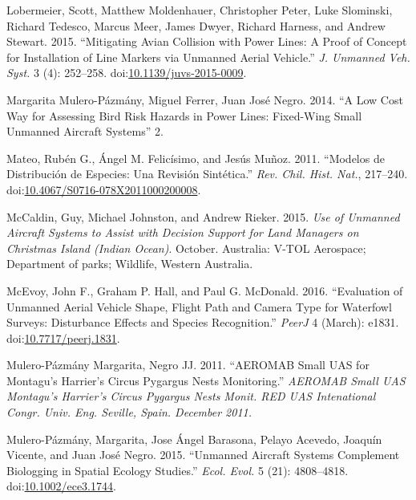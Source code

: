 \documentclass[]{interact}
\theoremstyle{plain}%
\theoremstyle{definition}
\theoremstyle{remark}
\begin{document}
\hypertarget{ref-lobermeier_mitigating_2015}{}
Lobermeier, Scott, Matthew Moldenhauer, Christopher Peter, Luke
Slominski, Richard Tedesco, Marcus Meer, James Dwyer, Richard Harness,
and Andrew Stewart. 2015. ``Mitigating Avian Collision with Power Lines:
A Proof of Concept for Installation of Line Markers via Unmanned Aerial
Vehicle.'' \emph{J. Unmanned Veh. Syst.} 3 (4): 252--258.
doi:\href{https://doi.org/10.1139/juvs-2015-0009}{10.1139/juvs-2015-0009}.

\hypertarget{ref-margarita_mulero-pazmany_juan_jose_negro_low_2014}{}
Margarita Mulero-Pázmány, Miguel Ferrer, Juan José Negro. 2014. ``A Low
Cost Way for Assessing Bird Risk Hazards in Power Lines: Fixed-Wing
Small Unmanned Aircraft Systems'' 2.

\hypertarget{ref-mateo_modelos_2011}{}
Mateo, Rubén G., Ángel M. Felicísimo, and Jesús Muñoz. 2011. ``Modelos
de Distribución de Especies: Una Revisión Sintética.'' \emph{Rev. Chil.
Hist. Nat.}, 217--240.
doi:\href{https://doi.org/10.4067/S0716-078X2011000200008}{10.4067/S0716-078X2011000200008}.

\hypertarget{ref-mccaldin_use_2015}{}
McCaldin, Guy, Michael Johnston, and Andrew Rieker. 2015. \emph{Use of
Unmanned Aircraft Systems to Assist with Decision Support for Land
Managers on Christmas Island (Indian Ocean)}. October. Australia: V-TOL
Aerospace; Department of parks; Wildlife, Western Australia.

\hypertarget{ref-mcevoy_evaluation_2016}{}
McEvoy, John F., Graham P. Hall, and Paul G. McDonald. 2016.
``Evaluation of Unmanned Aerial Vehicle Shape, Flight Path and Camera
Type for Waterfowl Surveys: Disturbance Effects and Species
Recognition.'' \emph{PeerJ} 4 (March): e1831.
doi:\href{https://doi.org/10.7717/peerj.1831}{10.7717/peerj.1831}.

\hypertarget{ref-mulero-pazmany_margarita_aeromab_2011}{}
Mulero-Pázmány Margarita, Negro JJ. 2011. ``AEROMAB Small UAS for
Montagu's Harrier's Circus Pygargus Nests Monitoring.'' \emph{AEROMAB
Small UAS Montagu's Harrier's Circus Pygargus Nests Monit. RED UAS
Intenational Congr. Univ. Eng. Seville, Spain. December 2011.}

\hypertarget{ref-mulero-pazmany_unmanned_2015}{}
Mulero-Pázmány, Margarita, Jose Ángel Barasona, Pelayo Acevedo, Joaquín
Vicente, and Juan José Negro. 2015. ``Unmanned Aircraft Systems
Complement Biologging in Spatial Ecology Studies.'' \emph{Ecol. Evol.} 5
(21): 4808--4818.
doi:\href{https://doi.org/10.1002/ece3.1744}{10.1002/ece3.1744}.
\end{document}
